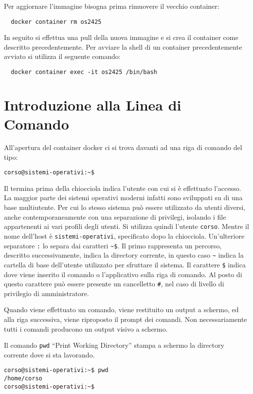 \documentclass{article}
\numberwithin{equation}{subsection}
\begin{document}
Per aggiornare l'immagine bisogna prima rimuovere il vecchio container:
\begin{verbatim}
  docker container rm os2425
\end{verbatim}
In seguito si effettua una pull della nuova immagine e si crea il container come descritto precedentemente. Per avviare la shell di un container precedentemente avviato si utilizza il 
seguente comando:
\begin{verbatim}
  docker container exec -it os2425 /bin/bash
\end{verbatim}

\clearpage

\section{Introduzione alla Linea di Comando}


All'apertura del container docker ci si trova davanti ad una riga di comando del tipo:
\begin{verbatim}
corso@sistemi-operativi:~$    
\end{verbatim}

Il termina prima della chiocciola indica l'utente con cui si è effettuato l'accesso. La maggior parte dei sistemi operativi moderni infatti sono sviluppati su di una base multiutente. Per cui lo stesso sistema può 
essere utilizzato da utenti diversi, anche contemporaneamente con una separazione di privilegi, isolando i file appartenenti ai vari profili degli utenti. Si utilizza quindi l'utente \verb|corso|. Mentre il nome 
dell'host è \verb|sistemi-operativi|, specificato dopo la chiocciola. Un'ulteriore separatore \verb|:| lo separa dai caratteri \verb|~$|. Il primo rappresenta un percorso, descritto successivamente, indica 
la directory corrente, in questo caso \verb|~| indica la cartella di base dell'utente utilizzato per sfruttare il sistema. Il carattere \verb|$| indica dove viene inserito il comando o l'applicativo sulla riga 
di comando. Al posto di questo carattere può essere presente un cancelletto \verb|#|, nel caso di livello di privilegio di amministratore. 

Quando viene effettuato un comando, viene restituito un output a schermo, ed alla riga successiva, viene riproposto il prompt dei comandi. Non necessariamente tutti i comandi producono un output visivo a schermo. 

Il comando \verb|pwd| ``Print Working Directory'' stampa a schermo la directory corrente dove si sta lavorando. 
\begin{verbatim}
corso@sistemi-operativi:~$ pwd
/home/corso
corso@sistemi-operativi:~$    
\end{verbatim}
\end{document}
